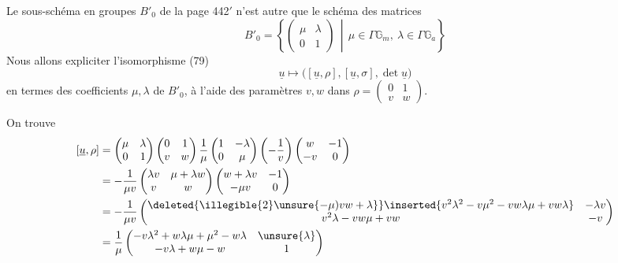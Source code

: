 Le sous-schéma en groupes $B'_0$ de la page 442$'$ n'est autre que le schéma des matrices
\[
B'_0=\left\{\begin{pmatrix}\mu&\lambda\\0&1\end{pmatrix}
\,\middle|\,\mu\in\Gamma\mathbb G_m,\ \lambda\in\Gamma\mathbb G_a\right\} \tag{44}
\]
Nous allons expliciter l'isomorphisme (79)
\[
\underline u\longmapsto\bigl([\underline u,\rho],[\underline u,\sigma],\det\underline u\bigr) \tag{45}
\]
en termes des coefficients $\mu,\lambda$ de $B'_0$, à l'aide des paramètres
$v,w$ dans $\rho=\begin{pmatrix}0&1\\v&w\end{pmatrix}$.


On trouve
\[
\begin{aligned}
{}[\underline u,\rho]
&=\begin{pmatrix}\mu&\lambda\\0&1\end{pmatrix}
\begin{pmatrix}0&1\\v&w\end{pmatrix}
\frac1\mu\begin{pmatrix}1&-\lambda\\0&\mu\end{pmatrix}
\left(-\frac1v\right)\begin{pmatrix}w&-1\\-v&0\end{pmatrix}\\
&=-\frac1{\mu v}\begin{pmatrix}\lambda v&\mu+\lambda w\\v&w\end{pmatrix}
\begin{pmatrix}w+\lambda v&-1\\-\mu v&0\end{pmatrix}\\
&=-\frac1{\mu v}
\begin{pmatrix}
\deleted{\illegible{2}\unsure{-\mu)vw+\lambda}}\inserted{v^2\lambda^2-v\mu^2-vw\lambda\mu+vw\lambda}&-\lambda v\\
v^2\lambda-vw\mu+vw&-v
\end{pmatrix}\\
&=\frac1\mu\begin{pmatrix}
-v\lambda^2+w\lambda\mu+\mu^2-w\lambda&\unsure{\lambda}\\
-v\lambda+w\mu-w&1
\end{pmatrix}
\end{aligned}
\]

